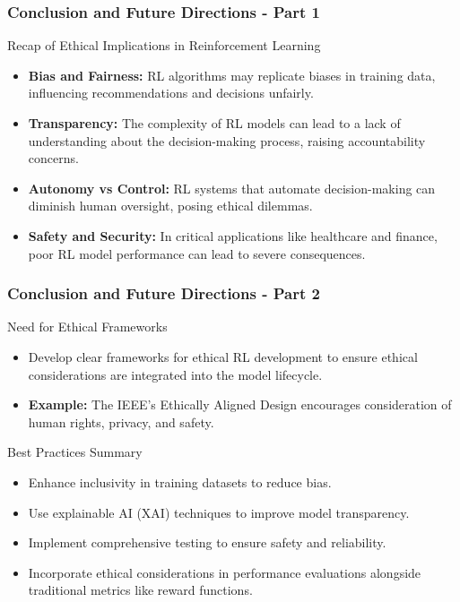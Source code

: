 \documentclass[aspectratio=169]{beamer}
\begin{document}
\begin{frame}[fragile]
    \frametitle{Conclusion and Future Directions - Part 1}
    \begin{block}{Recap of Ethical Implications in Reinforcement Learning}
        \begin{itemize}
            \item \textbf{Bias and Fairness:} RL algorithms may replicate biases in training data, influencing recommendations and decisions unfairly.
            \item \textbf{Transparency:} The complexity of RL models can lead to a lack of understanding about the decision-making process, raising accountability concerns.
            \item \textbf{Autonomy vs Control:} RL systems that automate decision-making can diminish human oversight, posing ethical dilemmas.
            \item \textbf{Safety and Security:} In critical applications like healthcare and finance, poor RL model performance can lead to severe consequences.
        \end{itemize}
    \end{block}
\end{frame}

\begin{frame}[fragile]
    \frametitle{Conclusion and Future Directions - Part 2}
    \begin{block}{Need for Ethical Frameworks}
        \begin{itemize}
            \item Develop clear frameworks for ethical RL development to ensure ethical considerations are integrated into the model lifecycle.
            \item \textbf{Example:} The IEEE’s Ethically Aligned Design encourages consideration of human rights, privacy, and safety.
        \end{itemize}
    \end{block}
    
    \begin{block}{Best Practices Summary}
        \begin{itemize}
            \item Enhance inclusivity in training datasets to reduce bias.
            \item Use explainable AI (XAI) techniques to improve model transparency.
            \item Implement comprehensive testing to ensure safety and reliability.
            \item Incorporate ethical considerations in performance evaluations alongside traditional metrics like reward functions.
        \end{itemize}
    \end{block}
\end{frame}
\end{document}
